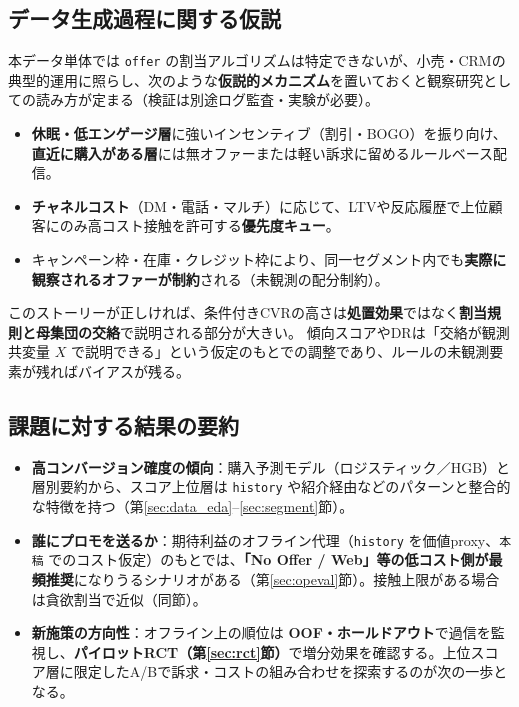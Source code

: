 \documentclass[11pt,a4paper]{article}
\begin{document}
\subsection{データ生成過程に関する仮説}
本データ単体では \texttt{offer} の割当アルゴリズムは特定できないが、小売・CRMの典型的運用に照らし、次のような\textbf{仮説的メカニズム}を置いておくと観察研究としての読み方が定まる（検証は別途ログ監査・実験が必要）。
\begin{itemize}\setlength{\itemsep}{0.2em}
  \item \textbf{休眠・低エンゲージ層}に強いインセンティブ（割引・BOGO）を振り向け、\textbf{直近に購入がある層}には無オファーまたは軽い訴求に留めるルールベース配信。
  \item \textbf{チャネルコスト}（DM・電話・マルチ）に応じて、LTVや反応履歴で上位顧客にのみ高コスト接触を許可する\textbf{優先度キュー}。
  \item キャンペーン枠・在庫・クレジット枠により、同一セグメント内でも\textbf{実際に観察されるオファーが制約}される（未観測の配分制約）。
\end{itemize}
このストーリーが正しければ、条件付きCVRの高さは\textbf{処置効果}ではなく\textbf{割当規則と母集団の交絡}で説明される部分が大きい。
傾向スコアやDRは「交絡が観測共変量 $X$ で説明できる」という仮定のもとでの調整であり、ルールの未観測要素が残ればバイアスが残る\cite{ImbensRubin2015}。

\subsection{課題に対する結果の要約}
\begin{itemize}
  \item \textbf{高コンバージョン確度の傾向}：購入予測モデル（ロジスティック／HGB）と層別要約から、スコア上位層は \texttt{history} や紹介経由などのパターンと整合的な特徴を持つ（第\ref{sec:data_eda}--\ref{sec:segment}節）。
  \item \textbf{誰にプロモを送るか}：期待利益のオフライン代理（\texttt{history} を価値proxy、\texttt{本稿} でのコスト仮定）のもとでは、\textbf{「No Offer / Web」等の低コスト側が最頻推奨}になりうるシナリオがある（第\ref{sec:opeval}節）。接触上限がある場合は貪欲割当で近似（同節）。
  \item \textbf{新施策の方向性}：オフライン上の順位は \textbf{OOF・ホールドアウト}で過信を監視し、\textbf{パイロットRCT（第\ref{sec:rct}節）}で増分効果を確認する。上位スコア層に限定したA/Bで訴求・コストの組み合わせを探索するのが次の一歩となる。
\end{itemize}
\end{document}
